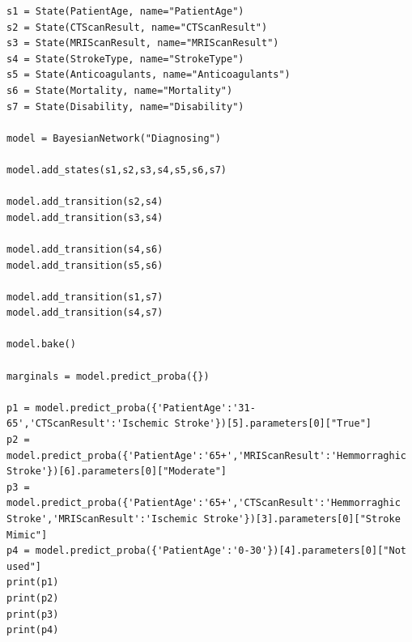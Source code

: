 \documentclass[a4paper, 11pt]{article}
\begin{document}
\begin{lstlisting}[title=diagnosing.py]
s1 = State(PatientAge, name="PatientAge")
s2 = State(CTScanResult, name="CTScanResult")
s3 = State(MRIScanResult, name="MRIScanResult")
s4 = State(StrokeType, name="StrokeType")
s5 = State(Anticoagulants, name="Anticoagulants")
s6 = State(Mortality, name="Mortality")
s7 = State(Disability, name="Disability")

model = BayesianNetwork("Diagnosing")

model.add_states(s1,s2,s3,s4,s5,s6,s7)

model.add_transition(s2,s4)
model.add_transition(s3,s4)

model.add_transition(s4,s6)
model.add_transition(s5,s6)

model.add_transition(s1,s7)
model.add_transition(s4,s7)

model.bake()

marginals = model.predict_proba({})

p1 = model.predict_proba({'PatientAge':'31-65','CTScanResult':'Ischemic Stroke'})[5].parameters[0]["True"]
p2 = model.predict_proba({'PatientAge':'65+','MRIScanResult':'Hemmorraghic Stroke'})[6].parameters[0]["Moderate"]
p3 = model.predict_proba({'PatientAge':'65+','CTScanResult':'Hemmorraghic Stroke','MRIScanResult':'Ischemic Stroke'})[3].parameters[0]["Stroke Mimic"]
p4 = model.predict_proba({'PatientAge':'0-30'})[4].parameters[0]["Not used"]
print(p1)
print(p2)
print(p3)
print(p4)
\end{lstlisting}

%
%
\end{document}
